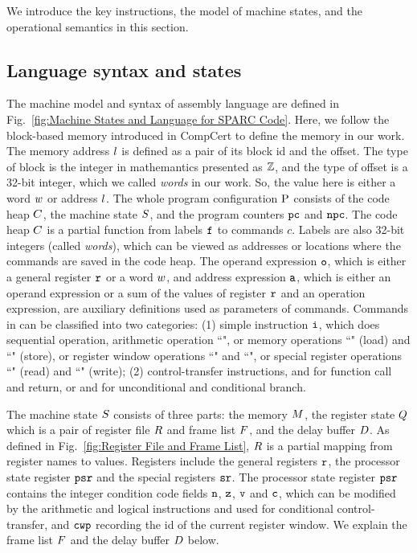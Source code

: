We introduce the key \sparc{} instructions, the model of machine
states, and the operational semantics in this section.

\subsection{Language syntax and states}
\label{subsec:syntax}

The machine model and syntax of \sparc{} assembly language
are defined in Fig.~\ref{fig:Machine States and Language for SPARC Code}.
Here, we follow the block-based memory \cite{CompCertMM} introduced
in CompCert to define the memory in our work.
The memory address $l$ is defined as a pair of
its block id and the offset. The type of block is the integer
in mathemantics presented as $\mathbb{Z}$, and the type of offset
is a 32-bit integer, which we called {\it words} in our work.
So, the value here is either a word $w$ or address $l$.
The whole program configuration $\text{P}$ consists of the code heap
$C$, the machine state $S$, and the program counters $\texttt{pc}$
and $\texttt{npc}$.
The code heap $C$ is a partial function
from labels $\texttt{f}_{}$ to commands $c$.
Labels are also 32-bit integers (called {\em words}),
which can be viewed as addresses or locations
where the commands are saved in the code heap.
The operand expression $\texttt{o}$, which is either a general
register $\texttt{r}_{}$ or a word $w$,
and address expression $\texttt{a}$,
which is either an operand expression or a
sum of the values of register $\texttt{r}_{}$ and an operation
expression, are auxiliary definitions used as parameters of commands.
Commands in \sparc{} can be classified into two categories:
(1) simple instruction $\texttt{i}{}$, which does sequential
operation, \eg{} arithmetic operation ``\cadd{}",
or memory operations
``\ld{}" (load) and ``\st{}" (store), or register window
operations ``\csave{}" and ``\crestore{}", or special
register operations ``\rd{}" (read) and ``\cwr{}" (write);
(2) control-transfer instructions,
\eg{} \call{} and \retl{} for
function call and return, or \jmp{} and \be{} for
unconditional and conditional branch.

The machine state $S$ consists of three parts:
the memory $M$, the register state $Q$
which is a pair of register file $R$ and frame list $F$,
and the delay buffer $D$.
As defined in Fig.~\ref{fig:Register File and Frame List},
$R$ is a partial mapping
from register names to values.
Registers include the general registers $\texttt{r}$,
the processor state register $\texttt{psr}$
and the special registers $\texttt{sr}$.
The processor state register $\texttt{psr}$ contains
the integer condition code fields $\texttt{n}$,
$\texttt{z}$, $\texttt{v}$ and $\texttt{c}$,
which can be modified by the arithmetic and logical instructions
and used for conditional control-transfer,
and $\texttt{cwp}$ recording the id of the current register window.
We explain the frame list $F$ and the delay buffer
$D$ below.

